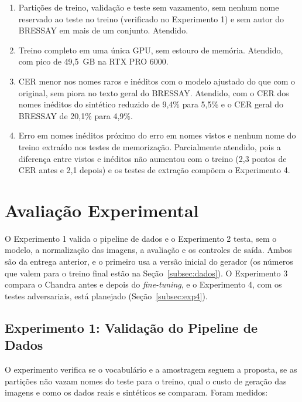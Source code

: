 \documentclass[12pt,a4paper]{article}
\begin{document}
\begin{enumerate}
    \item Partições de treino, validação e teste sem vazamento, sem nenhum nome reservado ao teste no treino (verificado no Experimento 1) e sem autor do BRESSAY em mais de um conjunto. Atendido.
    \item Treino completo em uma única GPU, sem estouro de memória. Atendido, com pico de 49,5~GB na RTX PRO 6000.
    \item CER menor nos nomes raros e inéditos com o modelo ajustado do que com o original, sem piora no texto geral do BRESSAY. Atendido, com o CER dos nomes inéditos do sintético reduzido de 9,4\% para 5,5\% e o CER geral do BRESSAY de 20,1\% para 4,9\%.
    \item Erro em nomes inéditos próximo do erro em nomes vistos e nenhum nome do treino extraído nos testes de memorização. Parcialmente atendido, pois a diferença entre vistos e inéditos não aumentou com o treino (2,3 pontos de CER antes e 2,1 depois) e os testes de extração compõem o Experimento 4.
\end{enumerate}

\section{Avaliação Experimental}
\label{sec:avaliacao}

O Experimento 1 valida o pipeline de dados e o Experimento 2 testa, sem o modelo, a normalização das imagens, a avaliação e os controles de saída. Ambos são da entrega anterior, e o primeiro usa a versão inicial do gerador (os números que valem para o treino final estão na Seção~\ref{subsec:dados}). O Experimento 3 compara o Chandra antes e depois do \emph{fine-tuning}, e o Experimento 4, com os testes adversariais, está planejado (Seção~\ref{subsec:exp4}).

\subsection{Experimento 1: Validação do Pipeline de Dados}

O experimento verifica se o vocabulário e a amostragem seguem a proposta, se as partições não vazam nomes do teste para o treino, qual o custo de geração das imagens e como os dados reais e sintéticos se comparam. Foram medidos:
\end{document}
